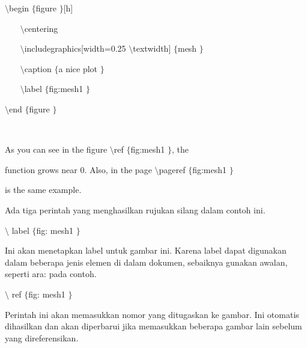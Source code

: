 \vspace{20pt}
\vspace{24pt}
\noindent
 $  \setminus $begin $  \{  $figure $  \}  $[h] \par
\vspace{12pt}
\noindent
~~~  $  \setminus $centering \par
\vspace{12pt}
\noindent
~~~  $  \setminus $includegraphics[width=0.25 $  \setminus $textwidth] $  \{  $mesh $  \}  $ \par
\vspace{12pt}
\noindent
~~~  $  \setminus $caption $  \{  $a nice plot $  \}  $ \par
\vspace{12pt}
\noindent
~~~  $  \setminus $label $  \{  $fig:mesh1 $  \}  $ \par
\vspace{12pt}
\noindent
 $  \setminus $end $  \{  $figure $  \}  $ \par
\noindent
 $  $ \par
\noindent
As you can see in the figure  $  \setminus $ref $  \{  $fig:mesh1 $  \}  $, the  \par
\vspace{12pt}
\noindent
function grows near 0. Also, in the page  $  \setminus $pageref $  \{  $fig:mesh1 $  \}  $  \par
\vspace{12pt}
\noindent
is the same example. \par
\vspace{12pt}
\vspace{12pt}
\vspace{12pt}
\vspace{12pt}
\vspace{12pt}
\noindent
Ada tiga perintah yang menghasilkan rujukan silang dalam contoh ini. \par
\vspace{12pt}
\noindent
 $  \setminus $ label  $  \{  $fig: mesh1 $  \}  $ \par
\noindent
Ini akan menetapkan label untuk gambar ini. Karena label dapat digunakan dalam beberapa jenis elemen di dalam dokumen, sebaiknya gunakan awalan, seperti ara: pada contoh. \par
\vspace{12pt}
\noindent
 $  \setminus $ ref  $  \{  $fig: mesh1 $  \}  $ \par
\noindent
Perintah ini akan memasukkan nomor yang ditugaskan ke gambar. Ini otomatis dihasilkan dan akan diperbarui jika memasukkan beberapa gambar lain sebelum yang direferensikan. \par
